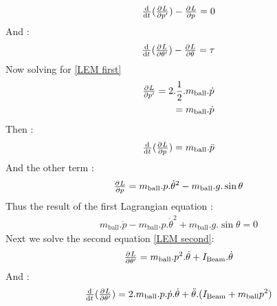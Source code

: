 \begin{equation}\label{LEM first}
	\begin{split}
		\od{}{t}(\pd{L}{p'}) - \pd{L}{p} = 0
	\end{split}
\end{equation}
And :
\begin{equation}\label{LEM second}
	\begin{split}
		\od{}{t}(\pd{L}{\theta'}) - \pd{L}{\theta} = \tau
	\end{split}	
\end{equation}
Now solving for \ref{LEM first}
\begin{equation}
	\begin{split}
	\pd{L}{p'} = 2 .\dfrac{1}{2}.m_{\text{ball}}.\dot{p} \\
	=m_{\text{ball}}.\dot{p}
	\end{split}	
\end{equation}
Then :
\begin{equation}
	\begin{split}
		\od{}{t}(\pd{L}{p}) = m_{\text{ball}}.\ddot{p}
	\end{split}
\end{equation}
And the other term :
\begin{equation}
	\begin{split}
	\pd{L}{p} = m_{\text{ball}}.p.\dot{\theta}^2 - m_{\text{ball}}.g.\sin{\theta}
	\end{split}
\end{equation}
Thus the result of the first Lagrangian equation :
\begin{equation}
	\begin{split}
		m_{\text{ball}}.\ddot{p} -  m_{\text{ball}}.p.\dot{\theta}^2 + m_{\text{ball}}.g.\sin{\theta} = 0
	\end{split}
\end{equation}
Next we solve the second equation \ref{LEM second}:
\begin{equation}
	\begin{split}
	\pd{L}{\theta'} = m_{\text{ball}}.p^2.\dot{\theta} + I_{\text{Beam}}.\dot{\theta}
	\end{split}
\end{equation}
And : 
\begin{equation}
	\begin{split}
		\od{}{t}(\pd{L}{\theta'}) = 2.m_{\text{ball}}.p.\dot{p}.\dot{\theta} + \ddot{\theta}.(I_{\text{Beam}} + m_{\text{ball}} p^2)
	\end{split}
\end{equation}
